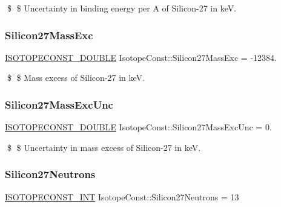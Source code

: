 \$ \$ Uncertainty in binding energy per A of Silicon-\/27 in keV. \mbox{\label{group___isotope_const-_silicon-_si27_gaefa57c87a43156220a266b814330b788}} 
\subsubsection{\texorpdfstring{Silicon27\+Mass\+Exc}{Silicon27MassExc}}
{\footnotesize\ttfamily \mbox{\hyperlink{group___isotope_const-_macros_ga8f45a7272ce02c0b4c65c44636ed719a}{I\+S\+O\+T\+O\+P\+E\+C\+O\+N\+S\+T\+\_\+\+D\+O\+U\+B\+LE}} Isotope\+Const\+::\+Silicon27\+Mass\+Exc = -\/12384.}

\$ \$ Mass excess of Silicon-\/27 in keV. \mbox{\label{group___isotope_const-_silicon-_si27_ga93f59109b779ed7b2272649916badaf5}} 
\subsubsection{\texorpdfstring{Silicon27\+Mass\+Exc\+Unc}{Silicon27MassExcUnc}}
{\footnotesize\ttfamily \mbox{\hyperlink{group___isotope_const-_macros_ga8f45a7272ce02c0b4c65c44636ed719a}{I\+S\+O\+T\+O\+P\+E\+C\+O\+N\+S\+T\+\_\+\+D\+O\+U\+B\+LE}} Isotope\+Const\+::\+Silicon27\+Mass\+Exc\+Unc = 0.}

\$ \$ Uncertainty in mass excess of Silicon-\/27 in keV. \mbox{\label{group___isotope_const-_silicon-_si27_gab6902dc45004185e0bdafb02f0eff163}} 
\subsubsection{\texorpdfstring{Silicon27\+Neutrons}{Silicon27Neutrons}}
{\footnotesize\ttfamily \mbox{\hyperlink{group___isotope_const-_macros_ga5f18360b3e99483a35c32d789e62621c}{I\+S\+O\+T\+O\+P\+E\+C\+O\+N\+S\+T\+\_\+\+I\+NT}} Isotope\+Const\+::\+Silicon27\+Neutrons = 13}

